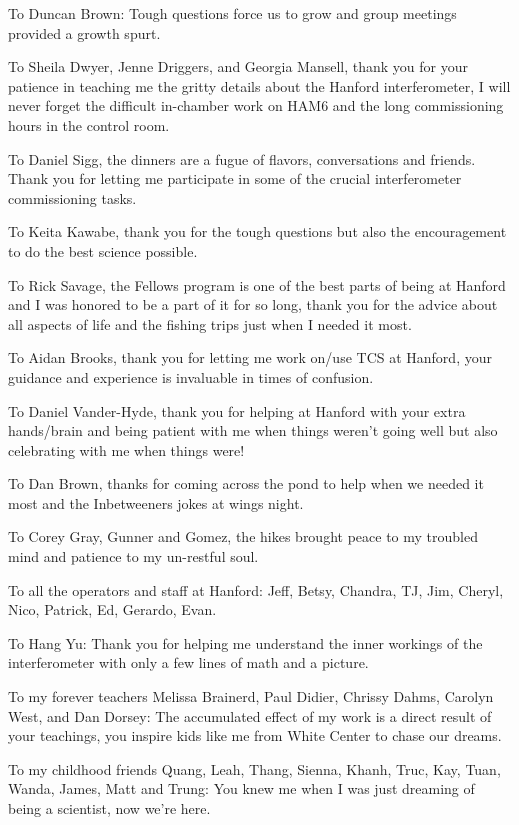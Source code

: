 \documentclass[oneside,12pt]{book}
\begin{document}
To Duncan Brown:  Tough questions force us to grow and group meetings provided a growth spurt.

To Sheila Dwyer, Jenne Driggers, and Georgia Mansell, thank you for your patience in teaching me the gritty details about the Hanford interferometer, I will never forget the difficult in-chamber work on HAM6 and the long commissioning hours in the control room.

To Daniel Sigg, the dinners are a fugue of flavors, conversations and friends. Thank you for letting me participate in some of the crucial interferometer commissioning tasks.

To Keita Kawabe, thank you for the tough questions but also the encouragement to do the best science possible.

To Rick Savage, the Fellows program is one of the best parts of being at Hanford and I was honored to be a part of it for so long, thank you for the advice about all aspects of life and the fishing trips just when I needed it most.

To Aidan Brooks, thank you for letting me work on/use TCS at Hanford, your guidance and experience is invaluable in times of confusion.

To Daniel Vander-Hyde, thank you for helping at Hanford with your extra hands/brain and being patient with me when things weren't going well but also celebrating with me when things were!

To Dan Brown, thanks for coming across the pond to help when we needed it most and the Inbetweeners jokes at wings night.

To Corey Gray, Gunner and Gomez, the hikes brought peace to my troubled mind and patience to my un-restful soul.

To all the operators and staff at Hanford: Jeff, Betsy, Chandra, TJ, Jim, Cheryl, Nico, Patrick, Ed, Gerardo, Evan.

To Hang Yu: Thank you for helping me understand the inner workings of the interferometer with only a few lines of math and a picture.

To my forever teachers Melissa Brainerd, Paul Didier, Chrissy Dahms, Carolyn West, and Dan Dorsey:  The accumulated effect of my work is a direct result of your teachings, you inspire kids like me from White Center to chase our dreams.

To my childhood friends Quang, Leah, Thang, Sienna, Khanh, Truc, Kay, Tuan, Wanda, James, Matt and Trung:  You knew me when I was just dreaming of being a scientist, now we're here.
\end{document}
